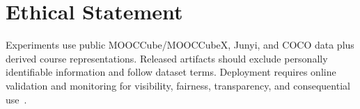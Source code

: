 \documentclass[letterpaper]{article}
\begin{document}
\section*{Ethical Statement}
Experiments use public MOOCCube/MOOCCubeX, Junyi, and COCO data plus derived course representations. Released artifacts should exclude personally identifiable information and follow dataset terms. Deployment requires online validation and monitoring for visibility, fairness, transparency, and consequential use~\cite{stray2024values,zhao2025fairnessdiversity}.


\end{document}
